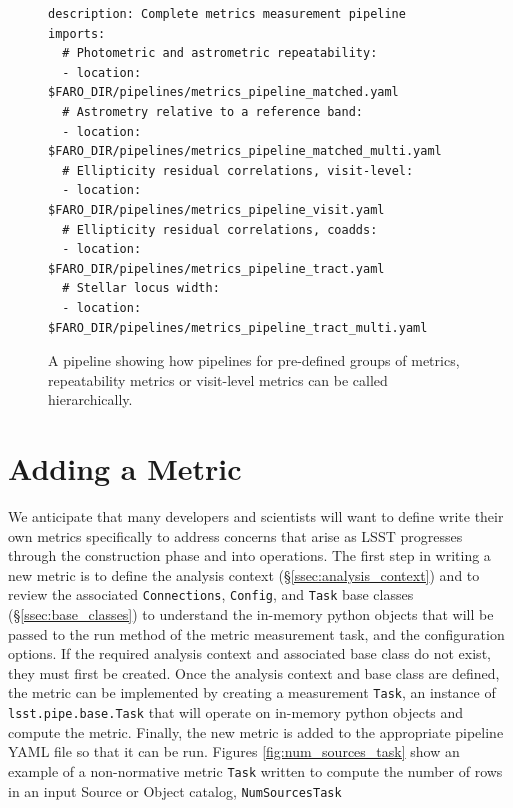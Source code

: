 \begin{figure}[h]
  \lstset{language=YAML}
  \begin{lstlisting}
description: Complete metrics measurement pipeline
imports:
  # Photometric and astrometric repeatability:
  - location: $FARO_DIR/pipelines/metrics_pipeline_matched.yaml
  # Astrometry relative to a reference band:
  - location: $FARO_DIR/pipelines/metrics_pipeline_matched_multi.yaml
  # Ellipticity residual correlations, visit-level:
  - location: $FARO_DIR/pipelines/metrics_pipeline_visit.yaml
  # Ellipticity residual correlations, coadds:
  - location: $FARO_DIR/pipelines/metrics_pipeline_tract.yaml
  # Stellar locus width:
  - location: $FARO_DIR/pipelines/metrics_pipeline_tract_multi.yaml
    \end{lstlisting}
  \caption{A  \faro pipeline showing how pipelines for pre-defined groups of metrics, repeatability metrics or visit-level metrics can be called hierarchically.}
  \label{fig:faro_pipeline_hierarchy}
\end{figure}

\section{Adding a  Metric} \label{sec:add}

We anticipate that many developers and scientists will want to define write their own metrics specifically to address concerns that arise as LSST progresses through the construction phase and into operations.
The first step in writing a new metric is to define the analysis context (\S \ref{ssec:analysis_context}) and to review the associated \texttt{Connections},  \texttt{Config}, and  \texttt{Task} base classes (\S \ref{ssec:base_classes}) to understand the in-memory python objects that will be passed to the run method of the metric measurement task, and the configuration options.
If the required analysis context and associated base class do not exist, they must first be created. 
Once the analysis context and base class are defined, the metric can be implemented by creating a measurement \texttt{Task}, an instance of \texttt{lsst.pipe.base.Task} that will operate on in-memory python objects and compute the metric. 
Finally, the new metric is added to the appropriate pipeline YAML file so that it can be run.
Figures \ref{fig:num_sources_task} show an example of a non-normative metric \texttt{Task} written to compute the number of rows in an input Source or Object catalog, \texttt{NumSourcesTask}

